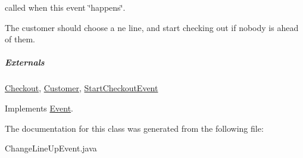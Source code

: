 called when this event \char`\"{}happens\char`\"{}. 

The customer should choose a ne line, and start checking out if nobody is ahead of them. \subparagraph*{Externals}

\hyperlink{class_checkout}{Checkout}, \hyperlink{class_customer}{Customer}, \hyperlink{class_start_checkout_event}{StartCheckoutEvent} 

Implements \hyperlink{class_event_fea360b9a95713e43cf3f9fa44150074}{Event}.

The documentation for this class was generated from the following file:\begin{CompactItemize}
\item 
ChangeLineUpEvent.java\end{CompactItemize}
